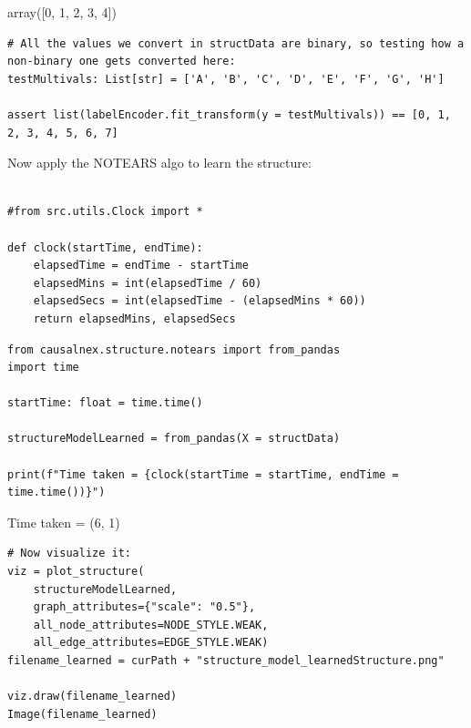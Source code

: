\documentclass[
]{article}
\begin{document}
array({[}0, 1, 2, 3, 4{]})

\begin{verbatim}
# All the values we convert in structData are binary, so testing how a non-binary one gets converted here:
testMultivals: List[str] = ['A', 'B', 'C', 'D', 'E', 'F', 'G', 'H']

assert list(labelEncoder.fit_transform(y = testMultivals)) == [0, 1, 2, 3, 4, 5, 6, 7]
\end{verbatim}

Now apply the NOTEARS algo to learn the structure:

\begin{verbatim}

#from src.utils.Clock import *

def clock(startTime, endTime):
    elapsedTime = endTime - startTime
    elapsedMins = int(elapsedTime / 60)
    elapsedSecs = int(elapsedTime - (elapsedMins * 60))
    return elapsedMins, elapsedSecs
\end{verbatim}

\begin{verbatim}
from causalnex.structure.notears import from_pandas
import time

startTime: float = time.time()

structureModelLearned = from_pandas(X = structData)

print(f"Time taken = {clock(startTime = startTime, endTime = time.time())}")
\end{verbatim}

Time taken = (6, 1)

\begin{verbatim}
# Now visualize it:
viz = plot_structure(
    structureModelLearned,
    graph_attributes={"scale": "0.5"},
    all_node_attributes=NODE_STYLE.WEAK,
    all_edge_attributes=EDGE_STYLE.WEAK)
filename_learned = curPath + "structure_model_learnedStructure.png"

viz.draw(filename_learned)
Image(filename_learned)




\end{verbatim}
\end{document}
